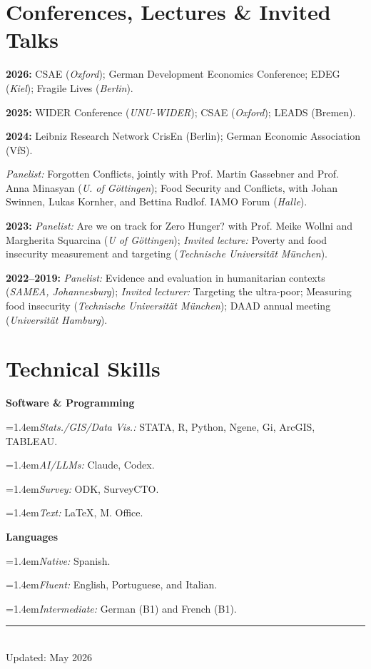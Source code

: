 \documentclass[10pt]{article}
\newcommand{\indentline}[1]{{\leftskip=1.4em\noindent\ignorespaces#1\par}} %
\begin{document}
\section{Conferences, Lectures \& Invited Talks}
\textbf{2026:} CSAE (\textit{Oxford}); German Development Economics Conference; EDEG (\textit{Kiel}); Fragile Lives (\textit{Berlin}).\par
\textbf{2025:} WIDER Conference (\textit{UNU-WIDER}); CSAE (\textit{Oxford}); LEADS (Bremen).\par
\textbf{2024:} Leibniz Research Network CrisEn (Berlin); German Economic Association (VfS).\par
\textit{Panelist:} Forgotten Conflicts, jointly with Prof. Martin Gassebner and Prof. Anna Minasyan (\textit{U. of Göttingen}); Food Security and Conflicts, with Johan Swinnen, Lukas Kornher, and Bettina Rudlof. IAMO Forum (\textit{Halle}).\par
\textbf{2023:} \textit{Panelist:} Are we on track for Zero Hunger? with Prof. Meike Wollni and Margherita Squarcina (\textit{U of Göttingen}); \textit{Invited lecture:} Poverty and food insecurity measurement and targeting (\textit{Technische Universität München}).\par
\textbf{2022--2019:} \textit{Panelist:} Evidence and evaluation in humanitarian contexts (\textit{SAMEA, Johannesburg}); \textit{Invited lecturer:} Targeting the ultra-poor; Measuring food insecurity (\textit{Technische Universität München}); DAAD annual meeting (\textit{Universität Hamburg}).\par

\section{Technical Skills}
\textbf{Software \& Programming}\par
\indentline{\textit{Stats./GIS/Data Vis.:} STATA, R, Python, Ngene, Gi, ArcGIS, TABLEAU.}
\indentline{\textit{AI/LLMs:} Claude, Codex.}
\indentline{\textit{Survey:} ODK, SurveyCTO.}
\indentline{\textit{Text:} LaTeX, M. Office.}
\textbf{Languages}\par
\indentline{\textit{Native:} Spanish.}
\indentline{\textit{Fluent:} English, Portuguese, and Italian.}
\indentline{\textit{Intermediate:} German (B1) and French (B1).}

\vfill
\begin{center}
  {\color{cvgrey}\rule{4em}{0.4pt}}\\[0.25em]
  \textcolor{cvgrey}{Updated: May 2026}
\end{center}
\end{document}
